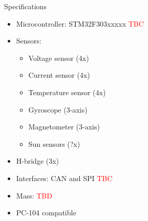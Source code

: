 \documentclass{beamer}
\begin{document}
\begin{frame}{Specifications}

    \begin{itemize}
        \item Microcontroller: STM32F303xxxxx \textcolor{red}{TBC}
        \item Sensors:
        \begin{itemize}
            \item Voltage sensor (4x)
            \item Current sensor (4x)
            \item Temperature sensor (4x)
            \item Gyroscope (3-axis)
            \item Magnetometer (3-axis)
            \item Sun sensors (?x)
        \end{itemize}
        \item H-bridge (3x)
        \item Interfaces: CAN and SPI \textcolor{red}{TBC}
        \item Mass: \textcolor{red}{TBD}
        \item PC-104 compatible
    \end{itemize}

\end{frame}
\end{document}
